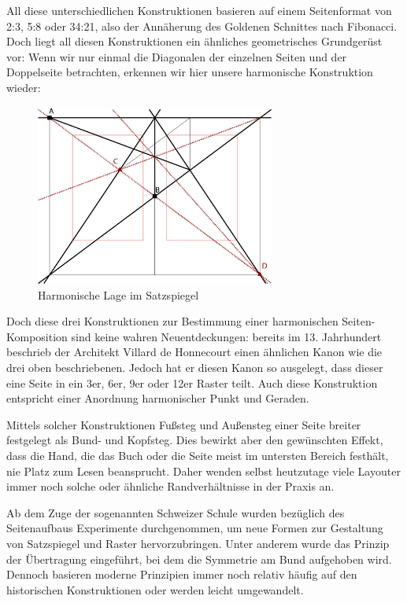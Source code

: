 \documentclass[12pt,a4paper]{article}
\begin{document}
All diese unterschiedlichen Konstruktionen basieren auf einem Seitenformat von 2:3, 5:8 oder 34:21, also der Annäherung des Goldenen Schnittes nach Fibonacci. Doch liegt all diesen Konstruktionen ein ähnliches geometrisches Grundgerüst vor: Wenn wir nur einmal die Diagonalen der einzelnen Seiten und der Doppelseite betrachten, erkennen wir hier unsere harmonische Konstruktion wieder:

\begin{figure}[htbp]
\centering
\includegraphics[width=0.7\textwidth]{Bilder/Van_de_Graaf.png}
\caption{Harmonische Lage im Satzspiegel}
\label{fig:harmVDG}
\end{figure}

Doch diese drei Konstruktionen zur Bestimmung einer harmonischen Seiten-Komposition sind keine wahren Neuentdeckungen: bereits im 13. Jahrhundert beschrieb der Architekt Villard de Honnecourt einen ähnlichen Kanon wie die drei oben beschriebenen. Jedoch hat er diesen Kanon so ausgelegt, dass dieser eine Seite in ein 3er, 6er, 9er oder 12er Raster teilt. Auch diese Konstruktion entspricht einer Anordnung harmonischer Punkt und Geraden. %

Mittels solcher Konstruktionen Fußsteg und Außensteg einer Seite breiter festgelegt als Bund- und Kopfsteg. Dies bewirkt aber den gewünschten Effekt, dass die Hand, die das Buch oder die Seite meist im untersten Bereich festhält, nie Platz zum Lesen beansprucht. Daher wenden selbst heutzutage viele Layouter immer noch solche oder ähnliche Randverhältnisse in der Praxis an.

Ab dem Zuge der sogenannten Schweizer Schule wurden bezüglich des Seitenaufbaus Experimente durchgenommen, um neue Formen zur Gestaltung von Satzspiegel und Raster hervorzubringen. Unter anderem wurde das Prinzip der Übertragung eingeführt, bei dem die Symmetrie am Bund aufgehoben wird. Dennoch basieren moderne Prinzipien immer noch relativ häufig auf den historischen Konstruktionen oder werden leicht umgewandelt. %
\end{document}
